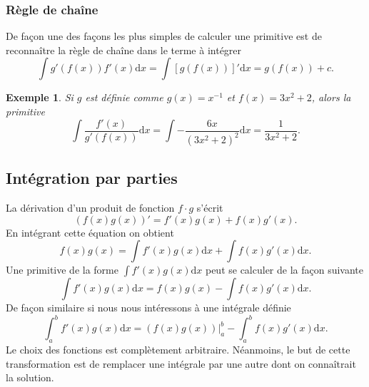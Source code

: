 \documentclass[a4paper,12pt]{book}
\newcommand{\dd}{\mathrm{d}}
\newtheorem*{exemple}{Exemple}
\begin{document}
\subsubsection{Règle de chaîne}
De façon une des façons les plus simples de calculer une primitive est de reconnaître la règle de chaîne 
dans le terme à intégrer
\begin{equation}
 \int g'(f(x))f'(x)\dd x=\int [g(f(x))]' \dd x=g(f(x))+c.
\end{equation}
\begin{exemple}
Si $g$ est définie comme $g(x)=x^{-1}$ et $f(x)=3x^2+2$, alors la primitive 
\begin{equation}
 \int \frac{f'(x)}{g'(f(x))}\dd x=\int -\frac{6 x}{(3x^2+2)^2}\dd x=\frac{1}{3x^2+2}.
\end{equation} 
\end{exemple}




\subsection{Intégration par parties}
La dérivation d'un produit de fonction $f\cdot g$ s'écrit
\begin{equation}
 (f(x)g(x))'=f'(x) g(x)+f(x) g'(x).
\end{equation}
En intégrant cette équation on obtient
\begin{equation}
 f(x)g(x)=\int f'(x) g(x)\dd x+\int f(x) g'(x)\dd x.
\end{equation}
Une primitive de la forme $\int f'(x) g(x)\dd x$ peut se calculer de la façon suivante
\begin{equation}
 \int f'(x) g(x)\dd x=f(x)g(x)-\int f(x) g'(x)\dd x.
\end{equation}
De façon similaire si nous nous intéressons à une intégrale définie
\begin{equation}
 \int_a^b f'(x) g(x)\dd x=\left.(f(x)g(x))\right|_a^b-\int_a^b f(x) g'(x)\dd x.
\end{equation}
Le choix des fonctions est complètement arbitraire. 
Néanmoins, le but de cette transformation est de remplacer une intégrale par une autre dont on connaîtrait la solution.
\end{document}
